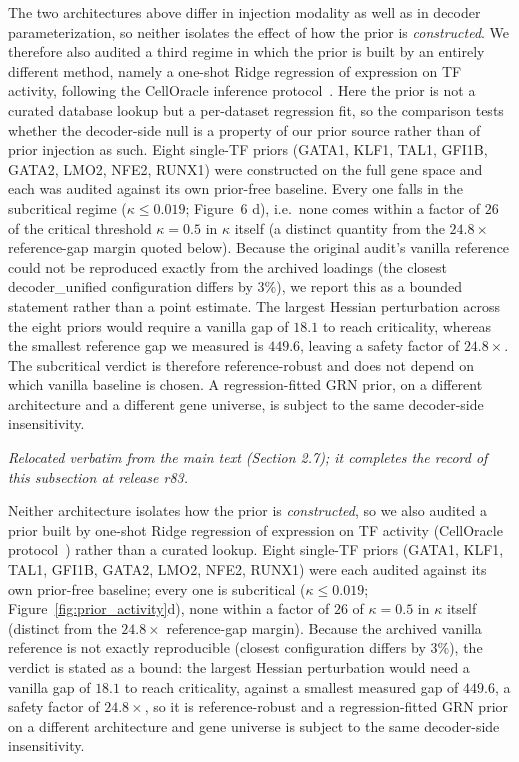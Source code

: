 \documentclass[11 pt,a4 paper]{article}
\begin{document}
The two architectures above differ in injection modality as well as in decoder parameterization, so neither isolates the effect of how the prior is \emph{constructed}. We therefore also audited a third regime in which the prior is built by an entirely different method, namely a one-shot Ridge regression of expression on TF activity, following the CellOracle inference protocol~\cite{kamimoto2023}. Here the prior is not a curated database lookup but a per-dataset regression fit, so the comparison tests whether the decoder-side null is a property of our prior source rather than of prior injection as such. Eight single-TF priors (GATA1, KLF1, TAL1, GFI1B, GATA2, LMO2, NFE2, RUNX1) were constructed on the full gene space and each was audited against its own prior-free baseline. Every one falls in the subcritical regime ($\kappa\le0.019$; Figure~6 d), i.e.\ none comes within a factor of $26$ of the critical threshold $\kappa=0.5$ in $\kappa$ itself (a distinct quantity from the $24.8\times$ reference-gap margin quoted below). Because the original audit's vanilla reference could not be reproduced exactly from the archived loadings (the closest decoder\_unified configuration differs by $3\%$), we report this as a bounded statement rather than a point estimate. The largest Hessian perturbation across the eight priors would require a vanilla gap of $18.1$ to reach criticality, whereas the smallest reference gap we measured is $449.6$, leaving a safety factor of $24.8\times$. The subcritical verdict is therefore reference-robust and does not depend on which vanilla baseline is chosen. A regression-fitted GRN prior, on a different architecture and a different gene universe, is subject to the same decoder-side insensitivity.

\noindent\emph{Relocated verbatim from the main text (Section 2.7); it completes the record of this subsection at release r83.}

Neither architecture isolates how the prior is \emph{constructed}, so we also audited a prior built by one-shot Ridge regression of expression on TF activity (CellOracle protocol~\cite{kamimoto2023}) rather than a curated lookup. Eight single-TF priors (GATA1, KLF1, TAL1, GFI1B, GATA2, LMO2, NFE2, RUNX1) were each audited against its own prior-free baseline; every one is subcritical ($\kappa\le0.019$; Figure~\ref{fig:prior_activity}d), none within a factor of $26$ of $\kappa=0.5$ in $\kappa$ itself (distinct from the $24.8\times$ reference-gap margin). Because the archived vanilla reference is not exactly reproducible (closest configuration differs by $3\%$), the verdict is stated as a bound: the largest Hessian perturbation would need a vanilla gap of $18.1$ to reach criticality, against a smallest measured gap of $449.6$, a safety factor of $24.8\times$, so it is reference-robust and a regression-fitted GRN prior on a different architecture and gene universe is subject to the same decoder-side insensitivity.
\end{document}
